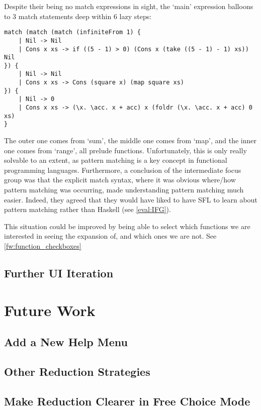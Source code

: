 Despite their being no match expressions in sight, the `main' expression balloons to 3 match statements deep within 6 lazy steps:

\begin{lstlisting}[language=SFL]
match (match (match (infiniteFrom 1) {
    | Nil -> Nil
    | Cons x xs -> if ((5 - 1) > 0) (Cons x (take ((5 - 1) - 1) xs)) Nil
}) {
    | Nil -> Nil
    | Cons x xs -> Cons (square x) (map square xs)
}) {
    | Nil -> 0
    | Cons x xs -> (\x. \acc. x + acc) x (foldr (\x. \acc. x + acc) 0 xs)
}
\end{lstlisting}

The outer one comes from `sum', the middle one comes from `map', and the inner one comes from `range', all prelude functions. Unfortunately, this is only really solvable to an extent, as pattern matching is a key concept in functional programming languages. Furthermore, a conclusion of the intermediate focus group was that the explicit match syntax, where it was obvious where/how pattern matching was occurring, made understanding pattern matching much easier. Indeed, they agreed that they would have liked to have SFL to learn about pattern matching rather than Haskell (see \ref{eval:IFG}). 

This situation could be improved by being able to select which functions we are interested in seeing the expansion of, and which ones we are not. See \ref{fw:function_checkboxes}

\subsection{Further UI Iteration}

\section{Future Work}
\label{conc:future_work}
\subsection{Add a New Help Menu}
\subsection{Other Reduction Strategies}
\subsection{Make Reduction Clearer in Free Choice Mode}
